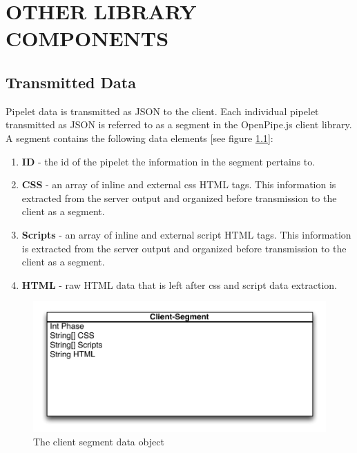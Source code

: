 \documentclass[12pt]{report}
\begin{document}
\chapter{OTHER LIBRARY COMPONENTS}

\section{Transmitted Data}

Pipelet data is transmitted as JSON to the client. Each individual pipelet transmitted as JSON is referred to as a segment in the OpenPipe.js client library. A segment contains the following data elements [see figure \ref{fig:clientSegmentDataObject}]:

\begin{enumerate}
\item \textbf{ID} - the id of the pipelet the information in the segment pertains to. 
\item \textbf{CSS} - an array of inline and external css HTML tags. This information is extracted from the server output and organized before transmission to the client as a segment.
\item \textbf{Scripts} - an array of inline and external script HTML tags. This information is extracted from the server output and organized before transmission to the client as a segment.
\item \textbf{HTML} - raw HTML data that is left after css and script data extraction.
\end{enumerate}

\begin{figure}[H]
\label{fig:clientSegmentDataObject}
\centering
\includegraphics[width=\textwidth,keepaspectratio]{figures/images/client_segment_data_object.pdf}
\caption{The client segment data object}
\end{figure}
\end{document}
